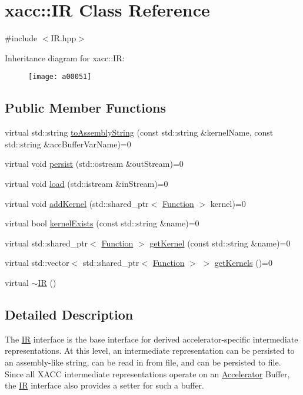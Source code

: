 \hypertarget{a00051}{}\section{xacc\+:\+:IR Class Reference}
\label{a00051}


{\ttfamily \#include $<$I\+R.\+hpp$>$}

Inheritance diagram for xacc\+:\+:IR\+:\begin{figure}[H]
\begin{center}
\leavevmode
\texttt{[image: a00051]}
\end{center}
\end{figure}
\subsection*{Public Member Functions}
\begin{DoxyCompactItemize}
\item 
virtual std\+::string \hyperlink{a00051_a8356cdff1919b88eabeb84fd7450cdb6}{to\+Assembly\+String} (const std\+::string \&kernel\+Name, const std\+::string \&acc\+Buffer\+Var\+Name)=0
\item 
virtual void \hyperlink{a00051_a414b72224d88473ad6190bb88102a3ea}{persist} (std\+::ostream \&out\+Stream)=0
\item 
virtual void \hyperlink{a00051_a444c2e4dc0faac500fb70fa93997e9bc}{load} (std\+::istream \&in\+Stream)=0
\item 
virtual void \hyperlink{a00051_abbbf8e6993c518597de32cd05d49d737}{add\+Kernel} (std\+::shared\+\_\+ptr$<$ \hyperlink{a00039}{Function} $>$ kernel)=0
\item 
virtual bool \hyperlink{a00051_afc9ccf5126f3fed19c2e879133b2f6d8}{kernel\+Exists} (const std\+::string \&name)=0
\item 
virtual std\+::shared\+\_\+ptr$<$ \hyperlink{a00039}{Function} $>$ \hyperlink{a00051_a6f49b4ba4b3a15142b04873284885f0d}{get\+Kernel} (const std\+::string \&name)=0
\item 
virtual std\+::vector$<$ std\+::shared\+\_\+ptr$<$ \hyperlink{a00039}{Function} $>$ $>$ \hyperlink{a00051_a88c50bfc5b279145360ddc0c3a703b9b}{get\+Kernels} ()=0
\item 
virtual \hyperlink{a00051_a09a76d71092254acae07e19fa2f34921}{$\sim$\+IR} ()
\end{DoxyCompactItemize}


\subsection{Detailed Description}
The \hyperlink{a00051}{IR} interface is the base interface for derived accelerator-\/specific intermediate representations. At this level, an intermediate representation can be persisted to an assembly-\/like string, can be read in from file, and can be persisted to file. Since all X\+A\+CC intermediate representations operate on an \hyperlink{a00011}{Accelerator} Buffer, the \hyperlink{a00051}{IR} interface also provides a setter for such a buffer. 

